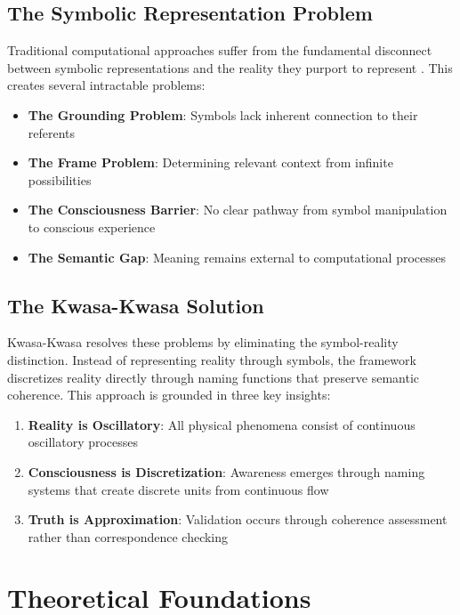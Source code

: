 \documentclass[11pt,twocolumn]{article}
\theoremstyle{remark}
\begin{document}
\subsection{The Symbolic Representation Problem}

Traditional computational approaches suffer from the fundamental disconnect between symbolic representations and the reality they purport to represent \cite{harnad1990symbol}. This creates several intractable problems:

\begin{itemize}
\item \textbf{The Grounding Problem}: Symbols lack inherent connection to their referents
\item \textbf{The Frame Problem}: Determining relevant context from infinite possibilities
\item \textbf{The Consciousness Barrier}: No clear pathway from symbol manipulation to conscious experience
\item \textbf{The Semantic Gap}: Meaning remains external to computational processes
\end{itemize}

\subsection{The Kwasa-Kwasa Solution}

Kwasa-Kwasa resolves these problems by eliminating the symbol-reality distinction. Instead of representing reality through symbols, the framework discretizes reality directly through naming functions that preserve semantic coherence. This approach is grounded in three key insights:

\begin{enumerate}
\item \textbf{Reality is Oscillatory}: All physical phenomena consist of continuous oscillatory processes
\item \textbf{Consciousness is Discretization}: Awareness emerges through naming systems that create discrete units from continuous flow
\item \textbf{Truth is Approximation}: Validation occurs through coherence assessment rather than correspondence checking
\end{enumerate}

\section{Theoretical Foundations}
\end{document}
